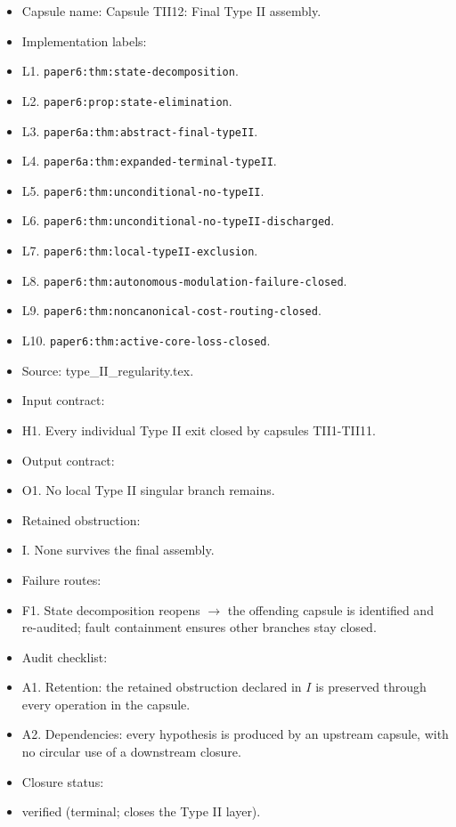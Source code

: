 \documentclass[11pt]{amsart}
\begin{document}
\begin{itemize}
  \item Capsule name: Capsule TII12: Final Type II assembly.
  \item Implementation labels:
  \item L1. \texttt{paper6:thm:state-decomposition}.
  \item L2. \texttt{paper6:prop:state-elimination}.
  \item L3. \texttt{paper6a:thm:abstract-final-typeII}.
  \item L4. \texttt{paper6a:thm:expanded-terminal-typeII}.
  \item L5. \texttt{paper6:thm:unconditional-no-typeII}.
  \item L6. \texttt{paper6:thm:unconditional-no-typeII-discharged}.
  \item L7. \texttt{paper6:thm:local-typeII-exclusion}.
  \item L8. \texttt{paper6:thm:autonomous-modulation-failure-closed}.
  \item L9. \texttt{paper6:thm:noncanonical-cost-routing-closed}.
  \item L10. \texttt{paper6:thm:active-core-loss-closed}.
  \item Source: type\_II\_regularity.tex.
  \item Input contract:
  \item H1. Every individual Type II exit closed by capsules TII1-TII11.
  \item Output contract:
  \item O1. No local Type II singular branch remains.
  \item Retained obstruction:
  \item I. None survives the final assembly.
  \item Failure routes:
  \item F1. State decomposition reopens $\to$ the offending capsule is identified and re-audited; fault containment ensures other branches stay closed.
  \item Audit checklist:
  \item A1. Retention: the retained obstruction declared in $I$ is preserved through every operation in the capsule.
  \item A2. Dependencies: every hypothesis is produced by an upstream capsule, with no circular use of a downstream closure.
  \item Closure status:
  \item verified (terminal; closes the Type II layer).
\end{itemize}
\end{document}
